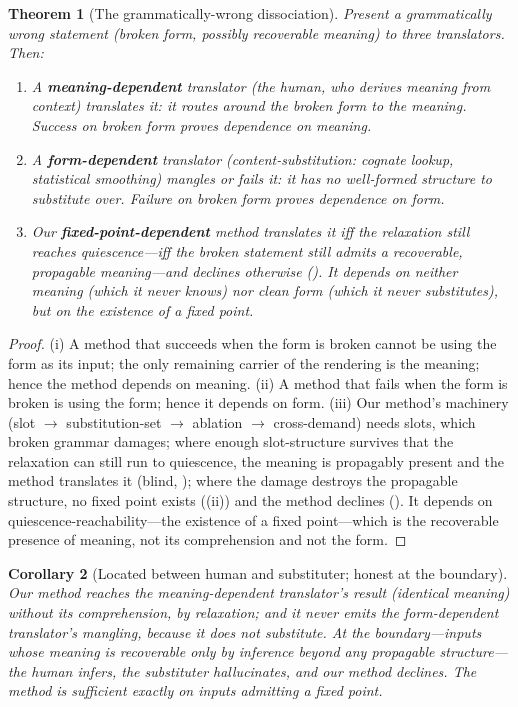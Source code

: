 \documentclass[11pt,a4paper]{article}
\theoremstyle{thmstyle}
\newtheorem{theorem}{Theorem}[section]
\newtheorem{corollary}[theorem]{Corollary}
\theoremstyle{definition}
\theoremstyle{remark}
\begin{document}
\begin{theorem}[The grammatically-wrong dissociation]
\label{thm:separating}
Present a grammatically wrong statement \textup{(}broken form, possibly
recoverable meaning\textup{)} to three translators. Then:
\begin{enumerate}[label=\textup{(\roman*)},leftmargin=2.2em]
\item A \textbf{meaning-dependent} translator (the human, who derives meaning
from context) translates it: it routes around the broken form to the
meaning. Success on broken form proves dependence on meaning.
\item A \textbf{form-dependent} translator (content-substitution: cognate
lookup, statistical smoothing) mangles or fails it: it has no well-formed
structure to substitute over. Failure on broken form proves dependence on
form.
\item Our \textbf{fixed-point-dependent} method translates it \emph{iff the
relaxation still reaches quiescence}---iff the broken statement still admits a
recoverable, propagable meaning---and \emph{declines otherwise}
(). It depends on neither meaning (which it never knows) nor
clean form (which it never substitutes), but on the existence of a fixed
point.
\end{enumerate}
\end{theorem}

\begin{proof}
\textup{(i)} A method that succeeds when the form is broken cannot be using
the form as its input; the only remaining carrier of the rendering is the
meaning; hence the method depends on meaning. \textup{(ii)} A method that
fails when the form is broken is using the form; hence it depends on form.
\textup{(iii)} Our method's machinery (slot $\to$ substitution-set $\to$
ablation $\to$ cross-demand) needs slots, which broken grammar damages; where
enough slot-structure survives that the relaxation can still run to
quiescence, the meaning is propagably present and the method translates it
(blind, ); where the damage destroys the propagable structure,
no fixed point exists ((ii)) and the method declines
(). It depends on quiescence-reachability---the existence of
a fixed point---which is the recoverable presence of meaning, not its
comprehension and not the form.
\end{proof}

\begin{corollary}[Located between human and substituter; honest at the boundary]
\label{cor:located}
Our method reaches the meaning-dependent translator's \emph{result} (identical
meaning) without its \emph{comprehension}, by relaxation; and it never emits
the form-dependent translator's mangling, because it does not substitute. At
the boundary---inputs whose meaning is recoverable only by inference beyond
any propagable structure---the human \emph{infers}, the substituter
\emph{hallucinates}, and our method \emph{declines}. The method is sufficient
exactly on inputs admitting a fixed point.
\end{corollary}
\end{document}
